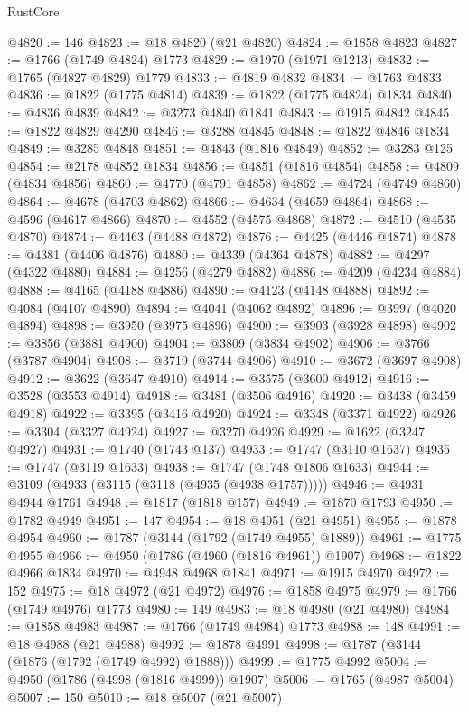 \begin{lexlean}{RustCore}
\begin{coremodule}
@4820 := 146
@4823 := @18 @4820 (@21 @4820)
@4824 := @1858 @4823
@4827 := @1766 (@1749 @4824) @1773
@4829 := @1970 (@1971 @1213)
@4832 := @1765 (@4827 @4829) @1779
@4833 := @4819 @4832
@4834 := @1763 @4833
@4836 := @1822 (@1775 @4814)
@4839 := @1822 (@1775 @4824) @1834
@4840 := @4836 @4839
@4842 := @3273 @4840 @1841
@4843 := @1915 @4842
@4845 := @1822 @4829 @4290
@4846 := @3288 @4845
@4848 := @1822 @4846 @1834
@4849 := @3285 @4848
@4851 := @4843 (@1816 @4849)
@4852 := @3283 @125
@4854 := @2178 @4852 @1834
@4856 := @4851 (@1816 @4854)
@4858 := @4809 (@4834 @4856)
@4860 := @4770 (@4791 @4858)
@4862 := @4724 (@4749 @4860)
@4864 := @4678 (@4703 @4862)
@4866 := @4634 (@4659 @4864)
@4868 := @4596 (@4617 @4866)
@4870 := @4552 (@4575 @4868)
@4872 := @4510 (@4535 @4870)
@4874 := @4463 (@4488 @4872)
@4876 := @4425 (@4446 @4874)
@4878 := @4381 (@4406 @4876)
@4880 := @4339 (@4364 @4878)
@4882 := @4297 (@4322 @4880)
@4884 := @4256 (@4279 @4882)
@4886 := @4209 (@4234 @4884)
@4888 := @4165 (@4188 @4886)
@4890 := @4123 (@4148 @4888)
@4892 := @4084 (@4107 @4890)
@4894 := @4041 (@4062 @4892)
@4896 := @3997 (@4020 @4894)
@4898 := @3950 (@3975 @4896)
@4900 := @3903 (@3928 @4898)
@4902 := @3856 (@3881 @4900)
@4904 := @3809 (@3834 @4902)
@4906 := @3766 (@3787 @4904)
@4908 := @3719 (@3744 @4906)
@4910 := @3672 (@3697 @4908)
@4912 := @3622 (@3647 @4910)
@4914 := @3575 (@3600 @4912)
@4916 := @3528 (@3553 @4914)
@4918 := @3481 (@3506 @4916)
@4920 := @3438 (@3459 @4918)
@4922 := @3395 (@3416 @4920)
@4924 := @3348 (@3371 @4922)
@4926 := @3304 (@3327 @4924)
@4927 := @3270 @4926
@4929 := @1622 (@3247 @4927)
@4931 := @1740 (@1743 @137)
@4933 := @1747 (@3110 @1637)
@4935 := @1747 (@3119 @1633)
@4938 := @1747 (@1748 @1806 @1633)
@4944 := @3109 (@4933 (@3115 (@3118 (@4935 (@4938 @1757)))))
@4946 := @4931 @4944 @1761
@4948 := @1817 (@1818 @157)
@4949 := @1870 @1793
@4950 := @1782 @4949
@4951 := 147
@4954 := @18 @4951 (@21 @4951)
@4955 := @1878 @4954
@4960 := @1787 (@3144 (@1792 (@1749 @4955) @1889))
@4961 := @1775 @4955
@4966 := @4950 (@1786 (@4960 (@1816 @4961)) @1907)
@4968 := @1822 @4966 @1834
@4970 := @4948 @4968 @1841
@4971 := @1915 @4970
@4972 := 152
@4975 := @18 @4972 (@21 @4972)
@4976 := @1858 @4975
@4979 := @1766 (@1749 @4976) @1773
@4980 := 149
@4983 := @18 @4980 (@21 @4980)
@4984 := @1858 @4983
@4987 := @1766 (@1749 @4984) @1773
@4988 := 148
@4991 := @18 @4988 (@21 @4988)
@4992 := @1878 @4991
@4998 := @1787 (@3144 (@1876 (@1792 (@1749 @4992) @1888)))
@4999 := @1775 @4992
@5004 := @4950 (@1786 (@4998 (@1816 @4999)) @1907)
@5006 := @1765 (@4987 @5004)
@5007 := 150
@5010 := @18 @5007 (@21 @5007)

\end{coremodule}
\end{lexlean}
